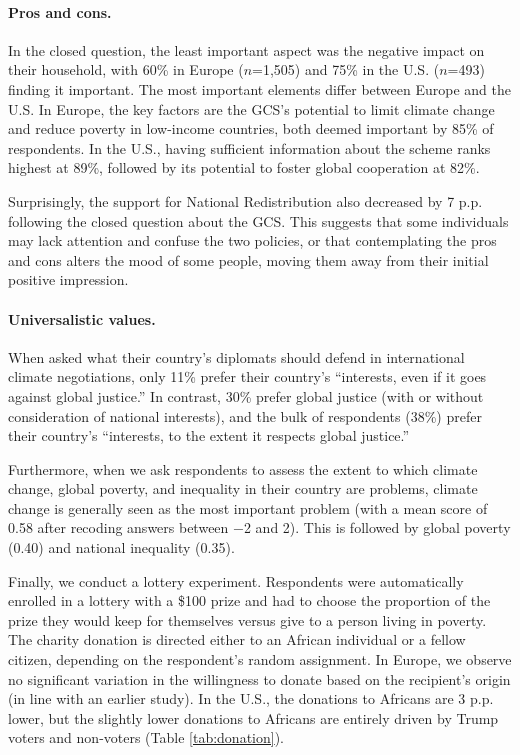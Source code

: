 \begin{small}
\paragraph{\small Pros and cons.}
In the closed question, the least important aspect was the negative impact on their household, with 60\% in Europe ($n$=1,505) and 75\% in the U.S. ($n$=493) finding it important. The most important elements differ between Europe and the U.S. In Europe, the key factors are the GCS's potential to limit climate change and reduce poverty in low-income countries, both deemed important by 85\% of respondents. In the U.S., having sufficient information about the scheme ranks highest at 89\%, followed by its potential to foster global cooperation at 82\%. 

Surprisingly, the support for National Redistribution also decreased by 7 p.p. following the closed question about the GCS. This suggests that some individuals may lack attention and confuse the two policies, or that contemplating the pros and cons alters the mood of some people, moving them away from their initial positive impression.

\paragraph{\small Universalistic values.}
When asked what their country's diplomats should defend in international climate negotiations, only 11\% prefer their country's ``interests, even if it goes against global justice.'' In contrast, 30\% prefer global justice (with or without consideration of national interests), and the bulk of respondents (38\%) prefer their country's ``interests, to the extent it respects global justice.''

Furthermore, when we ask respondents to assess the extent to which climate change, global poverty, and inequality in their country are problems, climate change is generally seen as the most important problem %
(with a mean score of 0.58 after recoding answers between $-$2 and 2). This is followed by global poverty (0.40) and national inequality (0.35). %

Finally, we conduct a lottery experiment. %
Respondents were automatically enrolled in a lottery with a \$100 prize and had to choose the proportion of the prize they would keep for themselves versus give to a person living in poverty. The %
charity donation is directed either to an African individual or a fellow citizen, depending on the respondent's random assignment. In Europe, we observe no significant variation in the willingness to donate based on the recipient's origin (in line with an earlier study\cite{cappelen_needs_2013}). In the U.S., the donations to Africans are 3 p.p. lower, %
but the slightly lower donations to Africans are entirely driven by Trump voters and non-voters (Table \ref{tab:donation}).


\end{small}
